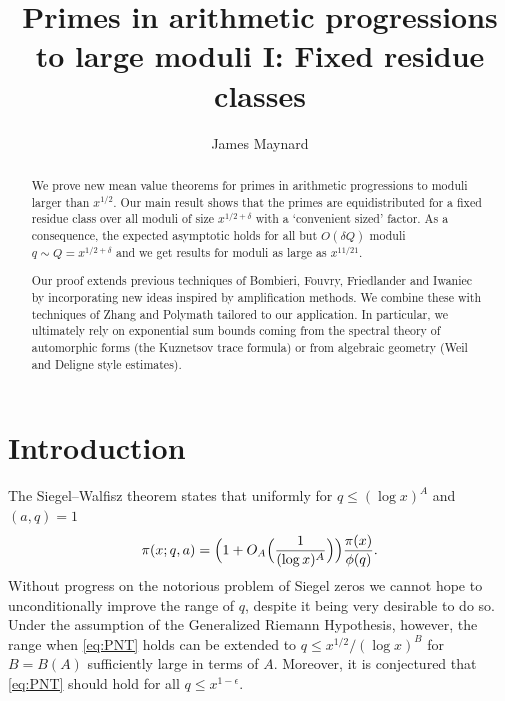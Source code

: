 \documentclass[10pt]{amsart}
\theoremstyle{plain}
\numberwithin{equation}{section}
\begin{document}
\title[Primes in arithmetic progressions to large moduli I]{Primes in arithmetic progressions to large moduli I: Fixed residue classes}
\author{James Maynard}
\address{Mathematical Institute, Radcliffe Observatory quarter, Woodstock Road, Oxford OX2 6GG, England}
%
%
%
%
\begin{abstract}
We prove new mean value theorems for primes in arithmetic progressions to moduli larger than $x^{1/2}$. Our main result shows that the primes are equidistributed for a fixed residue class over all moduli of size $x^{1/2+\delta}$ with a `convenient sized' factor. As a consequence, the expected asymptotic holds for all but $O(\delta Q)$ moduli $q\sim Q=x^{1/2+\delta}$ and we get results for moduli as large as $x^{11/21}$.

Our proof extends previous techniques of Bombieri, Fouvry, Friedlander and Iwaniec by incorporating new ideas inspired by amplification methods. We combine these with techniques of Zhang and Polymath tailored to our application. In particular, we ultimately rely on exponential sum bounds coming from the spectral theory of automorphic forms (the Kuznetsov trace formula) or from  algebraic geometry (Weil and Deligne style estimates).
\end{abstract}
%
%
%
%
\begin{samepage}
\maketitle
\tableofcontents
\end{samepage}
\parskip 7.2pt
\newpage
%
%
%
%
%
%
%
%
%
%
\section{Introduction}\label{sec:Introduction}
%
%
%
%
The Siegel--Walfisz theorem states that uniformly for $q\le (\log{x})^A$ and $(a,q)=1$
%
\begin{equation}
\pi(x;q,a)=\Bigl(1+O_A\Bigl(\frac{1}{(\log{x})^A}\Bigr)\Bigr)\frac{\pi(x)}{\phi(q)}.
\label{eq:PNT}
\end{equation}
%
Without progress on the notorious problem of Siegel zeros we cannot hope to unconditionally improve the range of $q$, despite it being very desirable to do so. Under the assumption of the Generalized Riemann Hypothesis, however, the range when \eqref{eq:PNT} holds can be extended to $q\le x^{1/2}/(\log{x})^B$ for $B=B(A)$ sufficiently large in terms of $A$. Moreover, it is conjectured \cite{Montgomery} that \eqref{eq:PNT} should hold for all $q\le x^{1-\epsilon}$.
\end{document}
